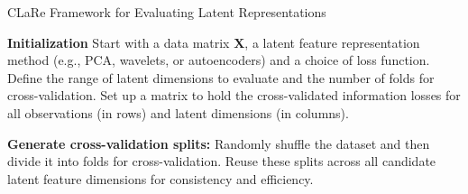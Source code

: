 



\begin{algorithm}
\caption{CLaRe Framework for Evaluating Latent Representations}
\begin{algorithmic}[1]

\State \textbf{Initialization} Start with a data matrix $\mathbf{X}$, a latent feature representation method (e.g., PCA, wavelets, or autoencoders) and a choice of loss function. Define the range of latent dimensions to evaluate and the number of folds for cross-validation. Set up a matrix to hold the cross-validated information losses for all observations (in rows) and latent dimensions (in columns).

\State \textbf{Generate cross-validation splits:} Randomly shuffle the dataset and then divide it into folds for cross-validation. Reuse these splits across all candidate latent feature dimensions for consistency and efficiency.


\end{algorithmic}
\end{algorithm}

